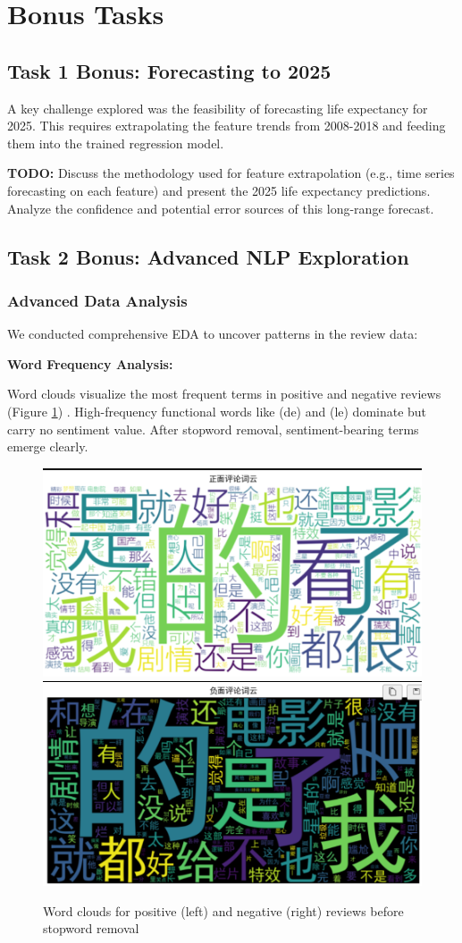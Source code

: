 \documentclass{article}
\begin{document}
\section{Bonus Tasks}
\label{sec:bonus}

\subsection{Task 1 Bonus: Forecasting to 2025}
A key challenge explored was the feasibility of forecasting life expectancy for 2025. This requires extrapolating the feature trends from 2008-2018 and feeding them into the trained regression model.

\textbf{TODO:} Discuss the methodology used for feature extrapolation (e.g., time series forecasting on each feature) and present the 2025 life expectancy predictions. Analyze the confidence and potential error sources of this long-range forecast.

\subsection{Task 2 Bonus: Advanced NLP Exploration}

\subsubsection{Advanced Data Analysis}
\label{sssec:advanced_analysis}

We conducted comprehensive EDA to uncover patterns in the review data:

\textbf{Word Frequency Analysis:} 

Word clouds visualize the most frequent terms in positive and negative reviews 
(Figure \ref{fig:wordclouds}) \cite{Zipf1949}. High-frequency functional words like (de) and (le) dominate 
but carry no sentiment value. After stopword removal, sentiment-bearing terms emerge clearly.

\begin{figure}[h]
    \centering
    \includegraphics[width=0.45\columnwidth]{pic/T2P2B1.1.png}
    \includegraphics[width=0.45\columnwidth]{pic/T2P2B1.2.png}
    \caption{Word clouds for positive (left) and negative (right) reviews before stopword removal}
    \label{fig:wordclouds}
\end{figure}
\end{document}
